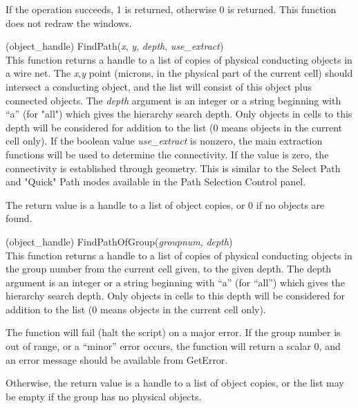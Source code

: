 \begin{description}
If the operation succeeds, 1 is returned, otherwise 0 is returned. 
This function does not redraw the windows.

\item{(object\_handle) \vt FindPath({\it x\/}, {\it y\/}, {\it depth},
 {\it use\_extract\/})}\\
This function returns a handle to a list of copies of physical
conducting objects in a wire net.  The {\it x},{\it y} point (microns,
in the physical part of the current cell) should intersect a
conducting object, and the list will consist of this object plus
connected objects.  The {\it depth} argument is an integer or a string
beginning with ``{\vt a}'' (for "all") which gives the hierarchy
search depth.  Only objects in cells to this depth will be considered
for addition to the list (0 means objects in the current cell only). 
If the boolean value {\it use\_extract} is nonzero, the main
extraction functions will be used to determine the connectivity.  If
the value is zero, the connectivity is established through geometry. 
This is similar to the {\cb Select Path} and {\cb "Quick" Path} modes
available in the {\cb Path Selection Control} panel.

The return value is a handle to a list of object copies, or 0 if
no objects are found.

\item{(object\_handle) \vt FindPathOfGroup({\it groupnum\/}, {\it depth})}\\
This function returns a handle to a list of copies of physical
conducting objects in the group number from the current cell given, to
the given depth.  The depth argument is an integer or a string
beginning with ``{\vt a}'' (for ``{\vt all}'') which gives the
hierarchy search depth.  Only objects in cells to this depth will be
considered for addition to the list (0 means objects in the current
cell only).

The function will fail (halt the script) on a major error.  If the
group number is out of range, or a ``minor'' error occurs, the
function will return a scalar 0, and an error message should be
available from {\vt GetError}.

Otherwise, the return value is a handle to a list of object copies, or
the list may be empty if the group has no physical objects.

\end{description}


